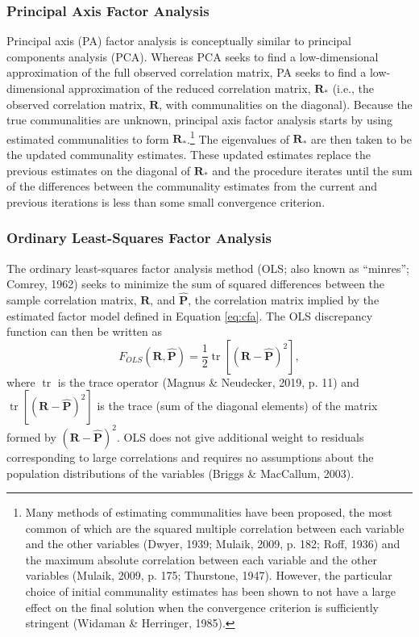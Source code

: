 \documentclass[
  english,
  man]{apa6}
\begin{document}
\hypertarget{principal-axis-factor-analysis}{%
\subsubsection{Principal Axis Factor Analysis}\label{principal-axis-factor-analysis}}

Principal axis (PA) factor analysis is conceptually similar to principal components analysis (PCA). Whereas PCA seeks to find a low-dimensional approximation of the full observed correlation matrix, PA seeks to find a low-dimensional approximation of the reduced correlation matrix, \(\mathbf{R}_*\) (i.e., the observed correlation matrix, \(\mathbf{R}\), with communalities on the diagonal). Because the true communalities are unknown, principal axis factor analysis starts by using estimated communalities to form \(\mathbf{R}_*\).\footnote{Many methods of estimating communalities have been proposed, the most common of which are the squared multiple correlation between each variable and the other variables (Dwyer, 1939; Mulaik, 2009, p. 182; Roff, 1936) and the maximum absolute correlation between each variable and the other variables (Mulaik, 2009, p. 175; Thurstone, 1947). However, the particular choice of initial communality estimates has been shown to not have a large effect on the final solution when the convergence criterion is sufficiently stringent (Widaman \& Herringer, 1985).} The eigenvalues of \(\mathbf{R}_*\) are then taken to be the updated communality estimates. These updated estimates replace the previous estimates on the diagonal of \(\textbf{R}_*\) and the procedure iterates until the sum of the differences between the communality estimates from the current and previous iterations is less than some small convergence criterion.

\hypertarget{ordinary-least-squares-factor-analysis}{%
\subsubsection{Ordinary Least-Squares Factor Analysis}\label{ordinary-least-squares-factor-analysis}}

The ordinary least-squares factor analysis method (OLS; also known as ``minres''; Comrey, 1962) seeks to minimize the sum of squared differences between the sample correlation matrix, \(\mathbf{R}\), and \(\hat{\mathbf{P}}\), the correlation matrix implied by the estimated factor model defined in Equation \eqref{eq:cfa}. The OLS discrepancy function can then be written as
\begin{equation}
F_{OLS}(\mathbf{R}, \hat{\mathbf{P}}) = \frac{1}{2} \mathop{\mathrm{tr}}\left[ (\mathbf{R} - \hat{\mathbf{P}})^2 \right],
\label{eq:ls-discrepancy}
\end{equation}
where \(\mathop{\mathrm{tr}}\) is the trace operator (Magnus \& Neudecker, 2019, p. 11) and \(\mathop{\mathrm{tr}}\left[ (\mathbf{R} - \hat{\mathbf{P}})^2 \right]\) is the trace (sum of the diagonal elements) of the matrix formed by \((\mathbf{R} - \hat{\mathbf{P}})^2\). OLS does not give additional weight to residuals corresponding to large correlations and requires no assumptions about the population distributions of the variables (Briggs \& MacCallum, 2003).
\end{document}
